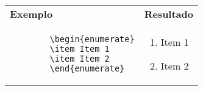 \begin{quadro}[!htb]
    \centering
    \begin{tabular}{p{7.5cm}|p{7.5cm}}
        \textbf{Exemplo} & \textbf{Resultado} \\
        
        \begin{verbatim}
        \begin{enumerate}
        \item Item 1
        \item Item 2
        \end{enumerate}
        \end{verbatim}
        & 
        \begin{enumerate}
        \item Item 1
        \item Item 2
        \end{enumerate}
        \\
        
    \end{tabular}
\end{quadro}

